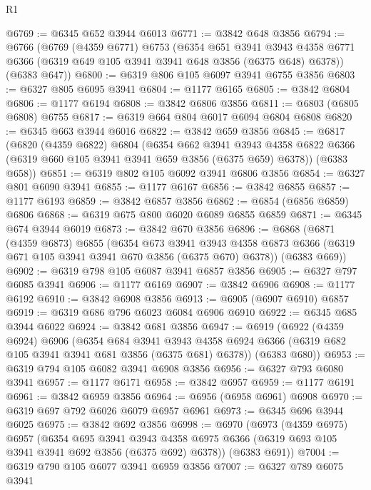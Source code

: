 \begin{lexlean}{R1}
\begin{coremodule}
@6769 := @6345 @652 @3944 @6013
@6771 := @3842 @648 @3856
@6794 := @6766
    (@6769
      (@4359 @6771)
      @6753
      (@6354
        @651
        @3941
        @3943
        @4358
        @6771
        @6366
        (@6319 @649 @105 @3941 @3941 @648 @3856 (@6375 @648) @6378))
      (@6383 @647))
@6800 := @6319 @806 @105 @6097 @3941 @6755 @3856
@6803 := @6327 @805 @6095 @3941
@6804 := @1177 @6165
@6805 := @3842 @6804
@6806 := @1177 @6194
@6808 := @3842 @6806 @3856
@6811 := @6803 (@6805 @6808) @6755
@6817 := @6319 @664 @804 @6017 @6094 @6804 @6808
@6820 := @6345 @663 @3944 @6016
@6822 := @3842 @659 @3856
@6845 := @6817
    (@6820
      (@4359 @6822)
      @6804
      (@6354
        @662
        @3941
        @3943
        @4358
        @6822
        @6366
        (@6319 @660 @105 @3941 @3941 @659 @3856 (@6375 @659) @6378))
      (@6383 @658))
@6851 := @6319 @802 @105 @6092 @3941 @6806 @3856
@6854 := @6327 @801 @6090 @3941
@6855 := @1177 @6167
@6856 := @3842 @6855
@6857 := @1177 @6193
@6859 := @3842 @6857 @3856
@6862 := @6854 (@6856 @6859) @6806
@6868 := @6319 @675 @800 @6020 @6089 @6855 @6859
@6871 := @6345 @674 @3944 @6019
@6873 := @3842 @670 @3856
@6896 := @6868
    (@6871
      (@4359 @6873)
      @6855
      (@6354
        @673
        @3941
        @3943
        @4358
        @6873
        @6366
        (@6319 @671 @105 @3941 @3941 @670 @3856 (@6375 @670) @6378))
      (@6383 @669))
@6902 := @6319 @798 @105 @6087 @3941 @6857 @3856
@6905 := @6327 @797 @6085 @3941
@6906 := @1177 @6169
@6907 := @3842 @6906
@6908 := @1177 @6192
@6910 := @3842 @6908 @3856
@6913 := @6905 (@6907 @6910) @6857
@6919 := @6319 @686 @796 @6023 @6084 @6906 @6910
@6922 := @6345 @685 @3944 @6022
@6924 := @3842 @681 @3856
@6947 := @6919
    (@6922
      (@4359 @6924)
      @6906
      (@6354
        @684
        @3941
        @3943
        @4358
        @6924
        @6366
        (@6319 @682 @105 @3941 @3941 @681 @3856 (@6375 @681) @6378))
      (@6383 @680))
@6953 := @6319 @794 @105 @6082 @3941 @6908 @3856
@6956 := @6327 @793 @6080 @3941
@6957 := @1177 @6171
@6958 := @3842 @6957
@6959 := @1177 @6191
@6961 := @3842 @6959 @3856
@6964 := @6956 (@6958 @6961) @6908
@6970 := @6319 @697 @792 @6026 @6079 @6957 @6961
@6973 := @6345 @696 @3944 @6025
@6975 := @3842 @692 @3856
@6998 := @6970
    (@6973
      (@4359 @6975)
      @6957
      (@6354
        @695
        @3941
        @3943
        @4358
        @6975
        @6366
        (@6319 @693 @105 @3941 @3941 @692 @3856 (@6375 @692) @6378))
      (@6383 @691))
@7004 := @6319 @790 @105 @6077 @3941 @6959 @3856
@7007 := @6327 @789 @6075 @3941

\end{coremodule}
\end{lexlean}

